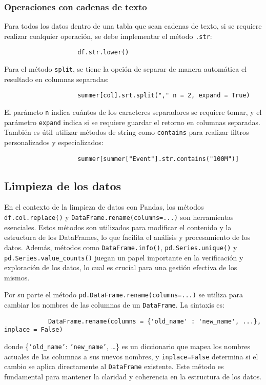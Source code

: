             \subsubsection{Operaciones con cadenas de texto}
                Para todos los datos dentro de una tabla que sean cadenas de texto, si se requiere realizar cualquier operación, se debe implementar el método \texttt{.str}:
                \begin{verbatim}
                    df.str.lower()
                \end{verbatim}
                Para el método \texttt{split}, se tiene la opción de separar de manera automática el resultado en columnas separadas:
                \begin{verbatim}
                    summer[col].srt.split("," n = 2, expand = True)
                \end{verbatim}
                El parámeto \texttt{n} indica cuántos de los caracteres separadores se requiere tomar, y el parámetro \texttt{expand} indica si se requiere guardar el retorno en columnas separadas. \\
                También es útil utilizar métodos de string como \texttt{contains} para realizar filtros personalizados y especializados:
                \begin{verbatim}
                    summer[summer["Event"].str.contains("100M")]
                \end{verbatim}

        \subsection{Limpieza de los datos}

            En el contexto de la limpieza de datos con Pandas, los métodos \texttt{df.col.replace()} y \texttt{DataFrame.rename(columns=...)} son herramientas esenciales. Estos métodos son utilizados para modificar el contenido y la estructura de los DataFrames, lo que facilita el análisis y procesamiento de los datos. Además, métodos como \texttt{DataFrame.info()}, \texttt{pd.Series.unique()} y \texttt{pd.Series.value\_counts()} juegan un papel importante en la verificación y exploración de los datos, lo cual es crucial para una gestión efectiva de los mismos.

            Por su parte el método \texttt{pd.DataFrame.rename(columns=...)} se utiliza para cambiar los nombres de las columnas de un \texttt{DataFrame}. La sintaxis es:
            \begin{verbatim}
            DataFrame.rename(columns = {'old_name' : 'new_name', ...}, inplace = False)
            \end{verbatim}
            donde \{\texttt{'old\_name'}: \texttt{'new\_name'}, \ldots\} es un diccionario que mapea los nombres actuales de las columnas a sus nuevos nombres, y \texttt{inplace=False} determina si el cambio se aplica directamente al \texttt{DataFrame} existente. Este método es fundamental para mantener la claridad y coherencia en la estructura de los datos.

